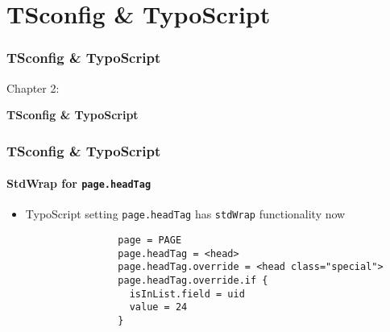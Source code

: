 %

\section{TSconfig \& TypoScript}
\begin{frame}[fragile]
	\frametitle{TSconfig \& TypoScript}

	\begin{center}\huge{Chapter 2:}\end{center}
	\begin{center}\huge{\color{typo3darkgrey}\textbf{TSconfig \& TypoScript}}\end{center}

\end{frame}


\begin{frame}[fragile]
	\frametitle{TSconfig \& TypoScript}
	\framesubtitle{StdWrap for \texttt{page.headTag}}

	\begin{itemize}
		\item TypoScript setting \texttt{page.headTag} has \texttt{stdWrap} functionality now

			\begin{lstlisting}
				page = PAGE
				page.headTag = <head>
				page.headTag.override = <head class="special">
				page.headTag.override.if {
		  		  isInList.field = uid
		  		  value = 24
				}
			\end{lstlisting}

	\end{itemize}

\end{frame}

